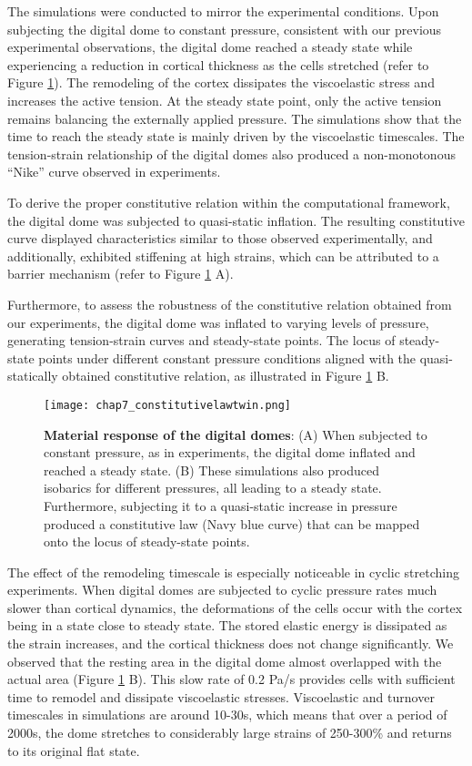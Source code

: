 The simulations were conducted to mirror the experimental conditions.
Upon subjecting the digital dome to constant pressure, consistent with
our previous experimental observations, the digital dome reached a
steady state while experiencing a reduction in cortical thickness as the
cells stretched (refer to Figure \ref{fig_7_7}). The
remodeling of the cortex dissipates the viscoelastic stress and
increases the active tension. At the steady state point, only the active
tension remains balancing the externally applied pressure. The
simulations show that the time to reach the steady state is mainly
driven by the viscoelastic timescales. The tension-strain relationship
of the digital domes also produced a non-monotonous ``Nike'' curve
observed in experiments.


To derive the proper constitutive relation within the computational
framework, the digital dome was subjected to quasi-static inflation. The
resulting constitutive curve displayed characteristics similar to those
observed experimentally, and additionally, exhibited stiffening at high
strains, which can be attributed to a barrier mechanism  (refer to Figure \ref{fig_7_7} A).

Furthermore, to assess the robustness of the constitutive relation
obtained from our experiments, the digital dome was inflated to varying
levels of pressure, generating tension-strain curves and steady-state
points. The locus of steady-state points under different constant
pressure conditions aligned with the quasi-statically obtained
constitutive relation, as illustrated in Figure \ref{fig_7_7} B.


\begin{figure}[t]
	\centering
	\texttt{[image: chap7\_constitutivelawtwin.png]}
	\caption{\label{fig_7_7} \textbf{Material response of the digital domes}: (A)  When subjected to constant pressure, as in experiments, the digital dome inflated and reached a steady state. (B)  These simulations also produced isobarics for different pressures, all leading to a steady state. Furthermore, subjecting it to a quasi-static increase in pressure produced a constitutive law (Navy blue curve) that can be mapped onto the locus of steady-state points.}
\end{figure}

The effect of the remodeling timescale is especially noticeable in
cyclic stretching experiments. When digital domes are subjected to
cyclic pressure rates much slower than cortical dynamics, the
deformations of the cells occur with the cortex being in a state close
to steady state. The stored elastic energy is dissipated as the strain
increases, and the cortical thickness does not change significantly. We
observed that the resting area in the digital dome almost overlapped
with the actual area (Figure \ref{fig_7_7} B). This
slow rate of 0.2 Pa/s provides cells with sufficient time to remodel and
dissipate viscoelastic stresses. Viscoelastic and turnover timescales in
simulations are around 10-30s, which means that over a period of 2000s,
the dome stretches to considerably large strains of 250-300\% and
returns to its original flat state.

